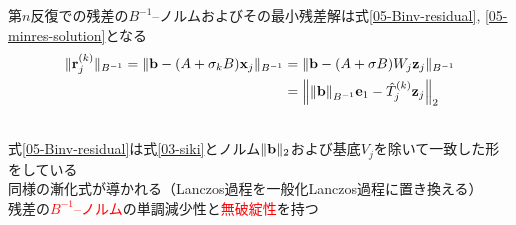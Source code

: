 

第$n$反復での残差の$B^{-1}$--ノルムおよびその最小残差解は式\eqref{05-Binv-residual}, \eqref{05-minres-solution}となる
\begin{align}
	\|\vb{r}_{j}^{(k)}\|_{B^{-1}} = \|\vb{b} - (A + \sigma_{k}B)\vb{x}_{j}\|_{B^{-1}}
		&= \|\vb{b} - (A + \sigma B)W_{j}\vb{z}_{j} \|_{B^{-1}} \notag \\
		&= \left\| \norm{\vb{b}}_{B^{-1}}\vb{e}_1 - \hat{T}_{j}^{(k)} \vb{z}_{j} \right\|_2
		\label{05-Binv-residual}\\
	&\hspace*{-17.5cm}\Rightarrow \ \vb{x}_{n}^{(k)} = \|\vb{b}\|_{B^{-1}} W_{j} R_{j}^{-1} Q_{j}^{\htop} \vb{e}_1
	\label{05-minres-solution}
\end{align}
式\eqref{05-Binv-residual}は式\eqref{03-siki}とノルム$\|\vb{b}\|_2$および基底$V_{j}$を除いて一致した形をしている\\
\myitem 同様の漸化式が導かれる（Lanczos過程を一般化Lanczos過程に置き換える）\\
\myitem 残差の\textcolor{red}{$B^{-1}$--ノルム}の単調減少性と\textcolor{red}{無破綻性}を持つ